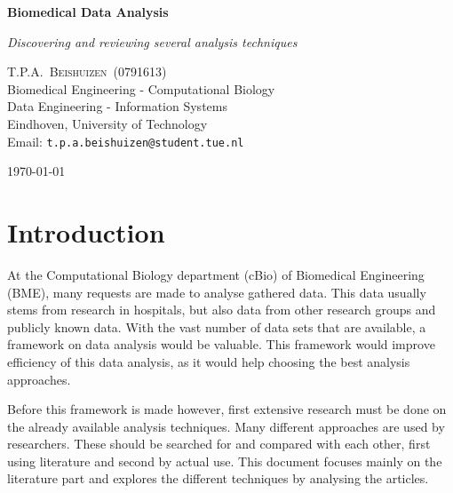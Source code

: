 \documentclass[10pt,a4paper]{article}
\newcommand{\documenttitle}{Biomedical Data Analysis }
\newcommand{\documentsubtitle}{Discovering and reviewing several analysis techniques}
\begin{document}
	
	\begin{titlepage}
		
		\center
		
		\vspace*{3cm}
		
		\textbf{\huge \documenttitle}
		
		\textit{\LARGE \documentsubtitle}
		
		\vspace*{2cm}
		
		\large
		\centering
		T.P.A.~\textsc{Beishuizen}~(0791613)\\
		Biomedical Engineering - Computational Biology\\
		Data Engineering - Information Systems\\
		Eindhoven, University of Technology\\
		Email: \texttt{t.p.a.beishuizen@student.tue.nl}
		
		\vfill
		
		\vspace*{1cm}
		
		\today
		
	\end{titlepage}
	
	\tableofcontents
	
	
	\pagestyle{fancy}
	\fancyhead{} %
	\fancyfoot{} %
	\renewcommand{\headrulewidth}{0.4pt}
	\renewcommand{\footrulewidth}{0.4pt}
	
	\clearpage
	
	\section{Introduction}
	
	At the Computational Biology department (cBio) of Biomedical Engineering (BME), many requests are made to analyse gathered data. This data usually stems from research in hospitals, but also data from other research groups and publicly known data. With the vast number of data sets that are available, a framework on data analysis would be valuable. This framework would improve efficiency of this data analysis, as it would help choosing the best analysis approaches. 
	
	Before this framework is made however, first extensive research must be done on the already available analysis techniques. Many different approaches are used by researchers. These should be searched for and compared with each other, first using literature and second by actual use. This document focuses mainly on the literature part and explores the different techniques by analysing the articles.
	
\end{document}

